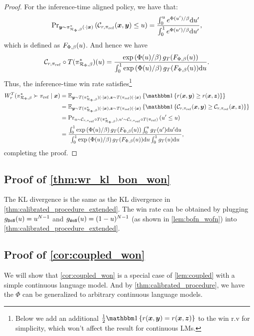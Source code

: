 \begin{proof}
For the inference-time aligned policy, we have that:
\[
    \text{Pr}_{{\bm{y}} \sim \pi^*_{\mathcal{R}_{\Phi}, \beta}(\cdot \mid {\bm{x}})}  \left(\mathcal{C}_{r, {\pi_{\rm ref}}}({\bm{x}}, {\bm{y}}) \le u\right) = \frac{\int_{0}^u e^{\Phi(u')/\beta} {\rm d} u'}{\int_{0}^1 e^{\Phi(u')/\beta} {\rm d} u'},
\]
which is defined as $F_{\Phi, \beta}(u)$. And hence we have
\[
     \mathcal{C}_{r, {\pi_{\rm ref}}} \circ T( \pi^*_{\mathcal{R}_{\Phi}, \beta}) (u) = \frac{ \exp \left(\Phi(u)/\beta\right)g_T( F_{\Phi, \beta}(u) )}{\int_{0}^1 \exp \left(\Phi(u)/\beta\right) g_T( F_{\Phi, \beta}(u) ) {\rm d} u }.
\]
Thus, the inference-time win rate satisfies\footnote{Below we add an additional $\frac{1}{2}\idc{r(\bx, \by) = r(\bx, \bz)}$ to the win r.v for simplicity, which won't affect the result for continuous LMs.}
\begin{align*}
     W^T_r(\op^*_{\cR_{\Phi}, \reg} \succ \bp \mid \bx) 
    & = \E_{\by \sim \pp(\op^*_{\cR_{\Phi}, \reg})(\cdot \mid \bx), \bz \sim \pp(\bp)(\cdot \mid \bx)} \left\{\idc{r(\bx, \by) \ge r(\bx, \bz)} \right\}\\
    & = \E_{\by \sim \pp(\op^*_{\cR_{\Phi}, \reg})(\cdot \mid \bx), \bz \sim \pp(\bp)(\cdot \mid \bx)} \left\{\idc{\qt_{r, \bp}(\bx, \by) \ge \qt_{r, \bp}(\bx, \bz)} \right\}\\
    & = \text{Pr}_{u \sim  \qt_{r, \bp} \circ T( \op^*_{\cR_{\Phi}, \reg}), u' \sim  \qt_{r, \bp} \circ T( \bp)} \Paren{ u' \le u} \\
    & = \frac{\int_{0}^1 \exp \Paren{\Phi(u)/\reg}g_T( F_{\Phi, \reg}(u) )\int_{0}^{u} g_T (u') \dd u' \dd u}{\int_{0}^1 \exp \Paren{\Phi(u)/\reg}g_T( F_{\Phi, \reg}(u) ) \dd u \int_{0}^1 \calp(u)\dd u},
\end{align*}
completing the proof.
\end{proof}
%
%
%
%
%

%
%
%


\subsection{Proof of \cref{thm:wr_kl_bon_won}}
The KL divergence is the same as the KL divergence in \cref{thm:calibrated_procedure_extended}. The win rate can be obtained by plugging $g_{\texttt{BoN}}(u) = u^{N-1}$ and $g_{\texttt{WoN}}(u) = (1 - u)^{N-1}$ (as shown in \cref{lem:bofn_wofn}) into \cref{thm:calibrated_procedure_extended}.

%
\subsection{Proof of \cref{cor:coupled_won}}
We will show that \cref{cor:coupled_won} is a special case of \cref{lem:coupled} with a simple continuous language model. And by \cref{thm:calibrated_procedure}, we have the $\Phi$ can be generalized to arbitrary continuous language models.


